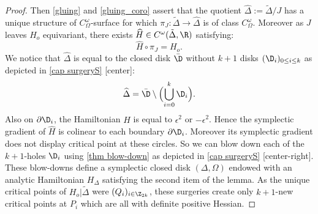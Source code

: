 \begin{proof}
Then \cref{gluing} and \cref{gluing_coro} assert that the quotient $\widehat \Delta:= \tilde \Delta/J$ has a unique structure of $C^\omega_\Omega$-surface for which $\pi_J: \tilde \Delta\to \widehat \Delta$ is of class $C^\omega_\Omega$. Moreover as $J$ leaves $H_o$ equivariant, there exists $\widehat H\in C^\omega(\tilde \Delta, \R)$ satisfying:
\[\widehat H\circ \pi_J= H_o.\]
We notice that $\widehat \Delta$ is equal to the closed disk $\bar \D$ without $k+1$ disks $(\D_i)_{0\le i\le k}$ as depicted in \cref{cap surgeryS} [center]:
\[\widehat \Delta= \bar \D \setminus \Bigl(\bigcup_{i=0}^k \D_i\Bigr).\]
Also on $\partial \D_i$, the Hamiltonian $\widehat H$ is equal to $\epsilon^2$ or $-\epsilon^2$. Hence the symplectic gradient of $\widehat H$ is colinear to each boundary $\partial \D_i$. Moreover its symplectic gradient does not display critical point at these circles.
So we can blow down each of the $k+1$-holes $\D_i$ using \cref{thm blow-down} as depicted in \cref{cap surgeryS} [center-right]. These blow-downs define a symplectic closed disk $(\Delta,\Omega)$ endowed with an analytic Hamiltonian $H_\Delta$ satisfying the second item of the lemma. As the unique critical points of $H_o|\tilde \Delta$ were $(Q_i)_{i\in \Z_{2k}}$, these surgeries create only $k+1$-new critical points at $P_i$ which are all with definite positive Hessian.
\end{proof}
